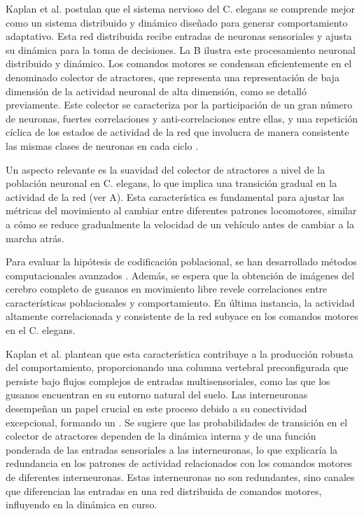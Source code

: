 Kaplan et al. \cite{kaplan_sensorimotor_2018} postulan que el sistema nervioso del C. elegans se comprende mejor como un sistema distribuido y dinámico diseñado para generar comportamiento adaptativo. Esta red distribuida recibe entradas de neuronas sensoriales y ajusta su dinámica para la toma de decisiones. La  B ilustra este procesamiento neuronal distribuido y dinámico. Los comandos motores se condensan eficientemente en el denominado colector de atractores, que representa una representación de baja dimensión de la actividad neuronal de alta dimensión, como se detalló previamente. Este colector se caracteriza por la participación de un gran número de neuronas, fuertes correlaciones y anti-correlaciones entre ellas, y una repetición cíclica de los estados de actividad de la red que involucra de manera consistente las mismas clases de neuronas en cada ciclo \cite{kato_global_2015}.


Un aspecto relevante es la suavidad del colector de atractores a nivel de la población neuronal en C. elegans, lo que implica una transición gradual en la actividad de la red (ver A). Esta característica es fundamental para ajustar las métricas del movimiento al cambiar entre diferentes patrones locomotores, similar a cómo se reduce gradualmente la velocidad de un vehículo antes de cambiar a la marcha atrás.

Para evaluar la hipótesis de codificación poblacional, se han desarrollado métodos computacionales avanzados \cite{elsayed_structure_2017}. Además, se espera que la obtención de imágenes del cerebro completo de gusanos en movimiento libre revele correlaciones entre características poblacionales y comportamiento. En última instancia, la actividad altamente correlacionada y consistente de la red subyace en los comandos motores en el C. elegans.


Kaplan et al. \cite{kaplan_sensorimotor_2018} plantean que esta característica contribuye a la producción robusta del comportamiento, proporcionando una columna vertebral preconfigurada que persiste bajo flujos complejos de entradas multisensoriales, como las que los gusanos encuentran en su entorno natural del suelo. Las interneuronas desempeñan un papel crucial en este proceso debido a su conectividad excepcional, formando un  \cite{cook_whole-animal_2019}. Se sugiere que las probabilidades de transición en el colector de atractores dependen de la dinámica interna y de una función ponderada de las entradas sensoriales a las interneuronas, lo que explicaría la redundancia en los patrones de actividad relacionados con los comandos motores de diferentes interneuronas. Estas interneuronas no son redundantes, sino canales que diferencian las entradas en una red distribuida de comandos motores, influyendo en la dinámica en curso. 




